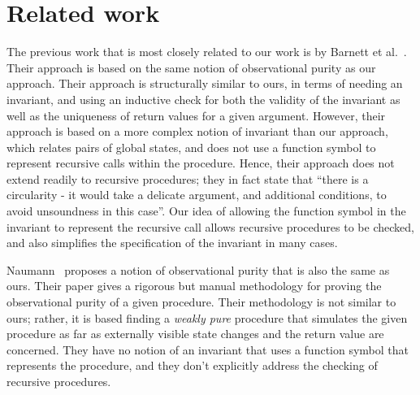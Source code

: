 \section{Related work}\label{sec:related}

The previous work that is most closely related to our work is by Barnett et
al.~\cite{barnett200499,barnett2006allowing}. Their approach is based on
the same notion of observational purity as our approach. Their approach is
structurally similar to ours, in terms of needing an invariant, and using
an inductive check for both the validity of the invariant as well as the
uniqueness of return values for a given argument.  However, their approach
is based on a more complex notion of invariant than our approach, which
relates pairs of global states, and does not use a function symbol to
represent recursive calls within the procedure. Hence, their approach does
not extend readily to recursive procedures; they in fact state that ``there
is a circularity - it would take a delicate argument, and additional
conditions, to avoid unsoundness in this case''. Our idea of allowing the
function symbol in the invariant to represent the recursive call allows
recursive procedures to be checked, and also simplifies the specification
of the invariant in many cases. 


Naumann~\cite{naumann2007observational} proposes a notion of observational
purity that is also the same as ours. Their paper gives a rigorous but manual
methodology for proving the observational purity of a
given procedure. Their methodology is not similar to ours; rather, it is
based finding a \emph{weakly pure} procedure that simulates the given
procedure as far as externally visible state changes and the return value
are concerned. They have no notion of an invariant that uses a function
symbol that represents the procedure, and they don't explicitly address the
checking of recursive procedures.

